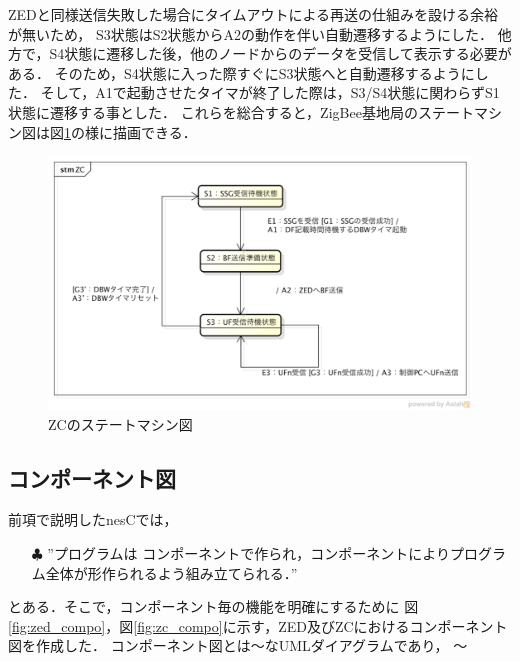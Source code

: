 \documentclass[12pt]{jreport}
\begin{document}
ZEDと同様送信失敗した場合にタイムアウトによる再送の仕組みを設ける余裕が無いため，
S3状態はS2状態からA2の動作を伴い自動遷移するようにした．
他方で，S4状態に遷移した後，他のノードからのデータを受信して表示する必要がある．
そのため，S4状態に入った際すぐにS3状態へと自動遷移するようにした．
そして，A1で起動させたタイマが終了した際は，S3/S4状態に関わらずS1状態に遷移する事とした．
これらを総合すると，ZigBee基地局のステートマシン図は図\ref{fig:zc_state}の様に描画できる．

\begin{figure}[bt]
 \centering
 \includegraphics[width=\columnwidth]{figure/zc_state.pdf}
 \caption{ZCのステートマシン図}
 \label{fig:zc_state}
\end{figure}

\subsection{コンポーネント図}

前項で説明したnesCでは，

\begin{itemize}
 \item[$\clubsuit$]”プログラムは コンポーネントで作られ，コンポーネントによりプログラム全体が形作られるよう組み立てられる．”
\end{itemize}
   
とある．そこで，コンポーネント毎の機能を明確にするために
図\ref{fig:zed_compo}，図\ref{fig:zc_compo}に示す，ZED及びZCにおけるコンポーネント図を作成した．
コンポーネント図とは〜なUMLダイアグラムであり，
〜

\end{document}
